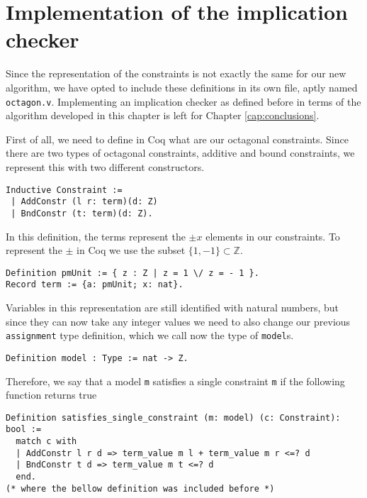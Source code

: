 \section{Implementation of the implication checker}

Since the representation of the constraints is not exactly the same for our new 
algorithm, we have opted to include these definitions in its own file, aptly named
\verb|octagon.v|. Implementing an implication checker as defined before in terms of
the algorithm developed in this chapter is left for Chapter \ref{cap:conclusions}.

First of all, we need to define in Coq what are our octagonal constraints. Since 
there are two types of octagonal constraints, additive and bound constraints, we
represent this with two different constructors.

\begin{verbatim}
Inductive Constraint :=
 | AddConstr (l r: term)(d: Z)
 | BndConstr (t: term)(d: Z).
\end{verbatim}

In this definition, the terms represent the $\pm x$ elements in our constraints. To
represent the $\pm$ in Coq we use the subset $\{1,-1\} \subset \mathbb{Z}$.

\begin{verbatim}
Definition pmUnit := { z : Z | z = 1 \/ z = - 1 }.
Record term := {a: pmUnit; x: nat}.
\end{verbatim}

Variables in this representation are still identified with natural numbers, but since
they can now take any integer values we need to also change our previous \texttt{assignment}
type definition, which we call now the type of \texttt{model}s.

\begin{verbatim}
Definition model : Type := nat -> Z.
\end{verbatim}

Therefore, we say that a model \texttt{m} satisfies a single constraint \texttt{m}
if the following function returns true

\begin{verbatim}
Definition satisfies_single_constraint (m: model) (c: Constraint): bool :=
  match c with 
  | AddConstr l r d => term_value m l + term_value m r <=? d
  | BndConstr t d => term_value m t <=? d
  end.
(* where the bellow definition was included before *)
\end{verbatim}

